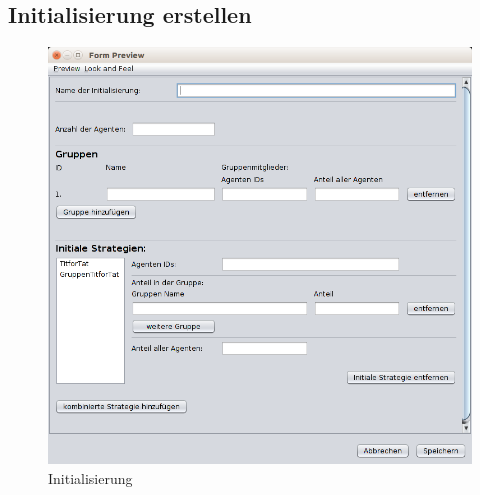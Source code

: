 \pagebreak

\subsection{Initialisierung erstellen}

\begin{figure}[hp] 
  \centering
     \includegraphics[width=1.1\textwidth]{GUI_Entwurf/NeueInitialisierung.png}
  \caption{Initialisierung}
  \label{fig:Bild1}
\end{figure}


